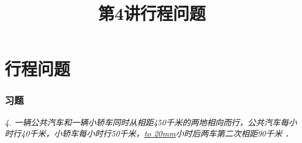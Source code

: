 \section{行程问题}

\title[第4讲\quad 行程问题]{第4讲\quad 行程问题} 
\author{}
\date{}

\begin{frame}
    \titlepage
\end{frame}

\setcounter{framecounter}{0}

\begin{frame}
    \frametitle{习题\theframecounter}
    \textit{4.	一辆公共汽车和一辆小轿车同时从相距450千米的两地相向而行，公共汽车每小时行40千米，小轿车每小时行50千米，\underline{\hbox to 20mm{}}小时后两车第二次相距90千米 ．} 
\end{frame}
